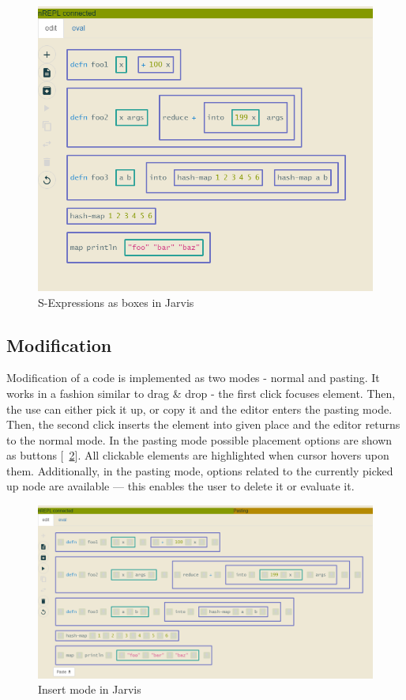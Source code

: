 \documentclass[11pt]{scrartcl}
\newcommand*{\figref}[1]{[\textbf{\figurename}~\ref{#1}]}
\begin{document}
\begin{figure}[hbt]
  \centering
  \includegraphics[scale=0.3]{img/j-boxes_f}
  \caption{S-Expressions as boxes in Jarvis}
\label{fig:j-box}
\end{figure}

\subsection{Modification}
Modification of a code is implemented as two modes - normal and pasting.
It works in a fashion similar to drag \& drop - the first click focuses element.
Then, the use can either pick it up, or copy it and the editor enters the
pasting mode.
Then, the second click inserts the element into given place and the editor
returns to the normal mode.
In the pasting mode possible placement options are shown as buttons
\figref{fig:j-insert}.
All clickable elements are highlighted when cursor hovers upon them.
Additionally, in the pasting mode, options related to the currently picked up
node are available --- this enables the user to delete it or evaluate it.


\begin{figure}[hbt]
  \centering
  \includegraphics[scale=0.3]{img/j-insert_f}
  \caption{Insert mode in Jarvis}
\label{fig:j-insert}
\end{figure}
\end{document}
